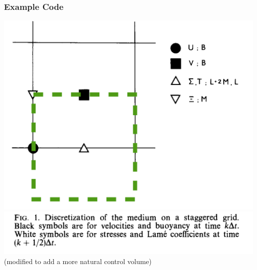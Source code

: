 \documentclass{beamer}
\begin{document}
\begin{frame}[fragile]
\frametitle{Example Code}
  \begin{minipage}{0.54\textwidth}
\includegraphics[width=\textwidth]{images/virieux1986_fig1_part1_mod.png}
\includegraphics[width=\textwidth]{images/virieux1986_fig1_part2.png}
    {\tiny(modified to add a more natural control volume)}
  \end{minipage}
  \begin{minipage}{0.44\textwidth}

\end{minipage}
\end{frame}
\end{document}
